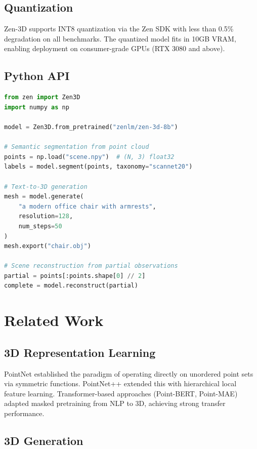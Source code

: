 \documentclass[11pt,a4paper]{article}
\begin{document}
\subsection{Quantization}

Zen-3D supports INT8 quantization via the Zen SDK with less than 0.5\% degradation on all
benchmarks. The quantized model fits in 10GB VRAM, enabling deployment on consumer-grade GPUs
(RTX 3080 and above).

\subsection{Python API}

\begin{lstlisting}[language=Python, caption=Zen-3D Inference Example]
from zen import Zen3D
import numpy as np

model = Zen3D.from_pretrained("zenlm/zen-3d-8b")

# Semantic segmentation from point cloud
points = np.load("scene.npy")  # (N, 3) float32
labels = model.segment(points, taxonomy="scannet20")

# Text-to-3D generation
mesh = model.generate(
    "a modern office chair with armrests",
    resolution=128,
    num_steps=50
)
mesh.export("chair.obj")

# Scene reconstruction from partial observations
partial = points[:points.shape[0] // 2]
complete = model.reconstruct(partial)
\end{lstlisting}

\section{Related Work}

\subsection{3D Representation Learning}

PointNet \cite{qi2017pointnet} established the paradigm of operating directly on unordered point
sets via symmetric functions. PointNet++ \cite{qi2017pointnet2} extended this with hierarchical
local feature learning. Transformer-based approaches (Point-BERT, Point-MAE) adapted masked
pretraining from NLP to 3D, achieving strong transfer performance.

\subsection{3D Generation}
\end{document}

